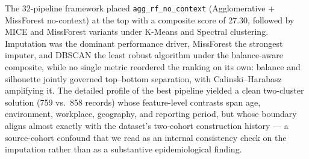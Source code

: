 The 32-pipeline framework placed \texttt{agg\_rf\_no\_context} (Agglomerative + MissForest no-context) at the top with a composite score of 27.30, followed by MICE and MissForest variants under K-Means and Spectral clustering. Imputation was the dominant performance driver, MissForest the strongest imputer, and DBSCAN the least robust algorithm under the balance-aware composite, while no single metric reordered the ranking on its own: balance and silhouette jointly governed top--bottom separation, with Calinski--Harabasz amplifying it. The detailed profile of the best pipeline yielded a clean two-cluster solution (759 vs.\ 858 records) whose feature-level contrasts span age, environment, workplace, geography, and reporting period, but whose boundary aligns almost exactly with the dataset's two-cohort construction history --- a source-cohort confound that we read as an internal consistency check on the imputation rather than as a substantive epidemiological finding.
